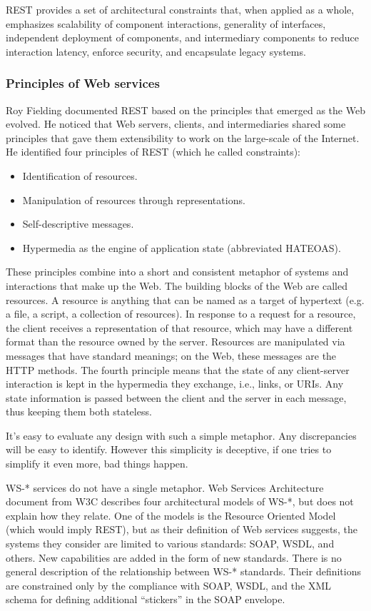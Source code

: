 REST provides a set of architectural constraints that, when applied as a whole, emphasizes scalability of component interactions, generality of interfaces, independent deployment of components, and intermediary components to reduce interaction latency, enforce security, and encapsulate legacy systems\cite{Fielding00Phd}.

\subsubsection{Principles of Web services}
Roy Fielding documented REST based on the principles that emerged as the Web evolved. He noticed that Web servers, clients, and intermediaries shared some principles that gave them extensibility to work on the large-scale of the Internet. He identified four principles of REST (which he called constraints):
\begin{itemize}
\item Identification of resources.
\item Manipulation of resources through representations.
\item Self-descriptive messages.
\item Hypermedia as the engine of application state (abbreviated HATEOAS).
\end{itemize}

These principles combine into a short and consistent metaphor of systems and interactions that make up the Web. The building blocks of the Web are called resources. A resource is anything that can be named as a target of hypertext (e.g. a file, a script, a collection of resources). In response to a request for a resource, the client receives a representation of that resource, which may have a different format than the resource owned by the server. Resources are manipulated via messages that have standard meanings; on the Web, these messages are the HTTP methods. The fourth principle means that the state of any client-server interaction is kept in the hypermedia they exchange, i.e., links, or URIs. Any state information is passed between the client and the server in each message, thus keeping them both stateless.

It's easy to evaluate any design with such a simple metaphor. Any discrepancies will be easy to identify. However this simplicity is deceptive, if one tries to simplify it even more, bad things happen.

WS-* services do not have a single metaphor. Web Services Architecture document\cite{Booth:2004} from W3C describes four architectural models of WS-*, but does not explain how they relate. One of the models is the Resource Oriented Model (which would imply REST), but as their definition of Web services suggests, the systems they consider are limited to various standards: SOAP, WSDL, and others. New capabilities are added in the form of new standards. There is no general description of the relationship between WS-* standards. Their definitions are constrained only by the compliance with SOAP, WSDL, and the XML schema for defining additional ``stickers'' in the SOAP envelope.

